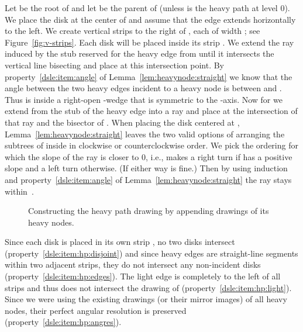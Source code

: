 \documentclass[11pt]{article}
\newenvironment{proof}{\noindent{\bf Proof:}}{\bigskip} \makeatletter
\begin{document}
\begin{proof}
  Let  be the root of  and let  be the parent of 
  (unless  is the heavy path at level 0). We place the disk 
  at the center of  and assume that the edge  extends
  horizontally to the left. We create  vertical strips  to the right of , each  of width ; see
  Figure~\ref{fig:v-strips}. Each disk  will be placed inside its
  strip . We extend the ray induced by the stub
  reserved for the heavy edge  from  until it intersects the
  vertical line bisecting  and place  at this intersection
  point. By property~\ref{dsle:item:angle} of
  Lemma~\ref{lem:heavynode:straight} we know that the angle between
  the two heavy edges incident to a heavy node is between  and
  . Thus  is inside a right-open -wedge  that
  is symmetric to the -axis. Now for  we extend
  from  the stub of the heavy edge  into a ray and
  place  at the intersection of that ray and the bisector of
  . When placing the disk  centered at , Lemma~\ref{lem:heavynode:straight} leaves the two valid options of arranging the subtrees of  inside  in clockwise or counterclockwise order. 
We pick the ordering for which the slope of the ray  is closer to 0, i.e.,  makes a right turn if  has a positive slope and a left turn otherwise. 
(If  either way is fine.)
Then by using induction and property~\ref{dsle:item:angle} of Lemma~\ref{lem:heavynode:straight} the ray  stays within~.

  \begin{figure}[tb]
    \centering
    \hfill
    \caption{Constructing the heavy path drawing by appending drawings of its heavy nodes.}
    \label{fig:straight-path}
  \end{figure}

  Since each disk  is placed in its own strip , no two disks
  intersect (property~\ref{dsle:item:hp:disjoint}) and since heavy edges
  are straight-line segments within two adjacent strips, they do not
  intersect any non-incident disks (property~\ref{dsle:item:hp:edges}). The
  light edge  is completely to the left of all strips and thus
  does not intersect the drawing of 
  (property~\ref{dsle:item:hp:light}). Since we were using the existing
  drawings (or their mirror images) of all heavy nodes, their perfect
  angular resolution is preserved (property~\ref{dsle:item:hp:angres}). 


\end{proof}
\end{document}
